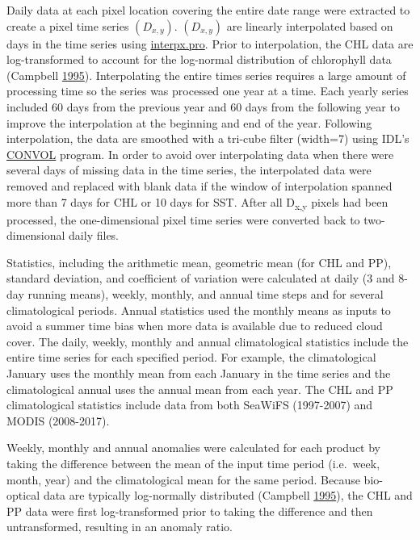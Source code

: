 \documentclass[
]{book}
\begin{document}
Daily data at each pixel location covering the entire date range were extracted to create a pixel time series \((D_{x,y})\). \((D_{x,y})\) are linearly interpolated based on days in the time series using \href{https://github.com/callumenator/idl/blob/master/external/JHUAPL/INTERPX.PRO}{interpx.pro}. Prior to interpolation, the CHL data are log-transformed to account for the log-normal distribution of chlorophyll data (Campbell \protect\hyperlink{ref-SOE2}{1995}). Interpolating the entire times series requires a large amount of processing time so the series was processed one year at a time. Each yearly series included 60 days from the previous year and 60 days from the following year to improve the interpolation at the beginning and end of the year. Following interpolation, the data are smoothed with a tri-cube filter (width=7) using IDL's \href{https://www.harrisgeospatial.com/docs/CONVOL.html}{CONVOL} program. In order to avoid over interpolating data when there were several days of missing data in the time series, the interpolated data were removed and replaced with blank data if the window of interpolation spanned more than 7 days for CHL or 10 days for SST. After all D\textsubscript{x,y} pixels had been processed, the one-dimensional pixel time series were converted back to two-dimensional daily files.

Statistics, including the arithmetic mean, geometric mean (for CHL and PP), standard deviation, and coefficient of variation were calculated at daily (3 and 8-day running means), weekly, monthly, and annual time steps and for several climatological periods. Annual statistics used the monthly means as inputs to avoid a summer time bias when more data is available due to reduced cloud cover. The daily, weekly, monthly and annual climatological statistics include the entire time series for each specified period. For example, the climatological January uses the monthly mean from each January in the time series and the climatological annual uses the annual mean from each year. The CHL and PP climatological statistics include data from both SeaWiFS (1997-2007) and MODIS (2008-2017).

Weekly, monthly and annual anomalies were calculated for each product by taking the difference between the mean of the input time period (i.e.~week, month, year) and the climatological mean for the same period. Because bio-optical data are typically log-normally distributed (Campbell \protect\hyperlink{ref-SOE2}{1995}), the CHL and PP data were first log-transformed prior to taking the difference and then untransformed, resulting in an anomaly ratio.
\end{document}
